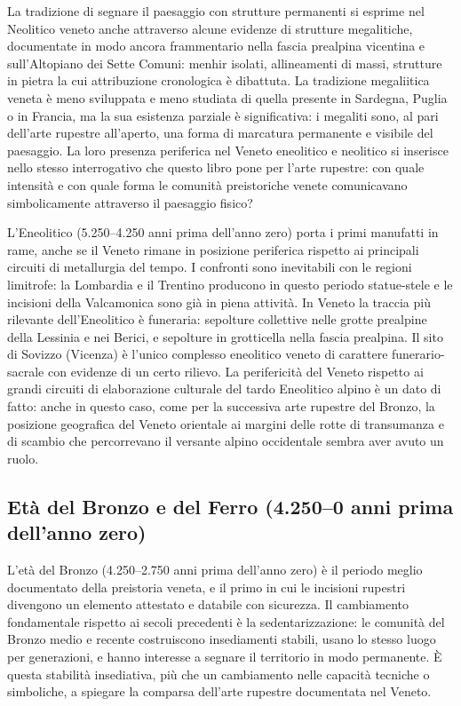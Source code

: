 La tradizione di segnare il paesaggio con strutture permanenti si esprime nel Neolitico veneto anche attraverso alcune evidenze di strutture megalitiche, documentate in modo ancora frammentario nella fascia prealpina vicentina e sull'Altopiano dei Sette Comuni: menhir isolati, allineamenti di massi, strutture in pietra la cui attribuzione cronologica è dibattuta. La tradizione megaliitica veneta è meno sviluppata e meno studiata di quella presente in Sardegna, Puglia o in Francia, ma la sua esistenza parziale è significativa: i megaliti sono, al pari dell'arte rupestre all'aperto, una forma di marcatura permanente e visibile del paesaggio. La loro presenza periferica nel Veneto eneolitico e neolitico si inserisce nello stesso interrogativo che questo libro pone per l'arte rupestre: con quale intensità e con quale forma le comunità preistoriche venete comunicavano simbolicamente attraverso il paesaggio fisico?

L'Eneolitico (5.250--4.250 anni prima dell'anno zero) porta i primi manufatti in rame, anche se il Veneto rimane in posizione periferica rispetto ai principali circuiti di metallurgia del tempo. I confronti sono inevitabili con le regioni limitrofe: la Lombardia e il Trentino producono in questo periodo statue-stele e le incisioni della Valcamonica sono già in piena attività. In Veneto la traccia più rilevante dell'Eneolitico è funeraria: sepolture collettive nelle grotte prealpine della Lessinia e nei Berici, e sepolture in grotticella nella fascia prealpina. Il sito di Sovizzo (Vicenza) è l'unico complesso eneolitico veneto di carattere funerario-sacrale con evidenze di un certo rilievo. La perifericità del Veneto rispetto ai grandi circuiti di elaborazione culturale del tardo Eneolitico alpino è un dato di fatto: anche in questo caso, come per la successiva arte rupestre del Bronzo, la posizione geografica del Veneto orientale ai margini delle rotte di transumanza e di scambio che percorrevano il versante alpino occidentale sembra aver avuto un ruolo.

\subsection{Età del Bronzo e del Ferro (4.250--0 anni prima dell'anno zero)}

L'età del Bronzo (4.250--2.750 anni prima dell'anno zero) è il periodo meglio documentato della preistoria veneta, e il primo in cui le incisioni rupestri divengono un elemento attestato e databile con sicurezza. Il cambiamento fondamentale rispetto ai secoli precedenti è la sedentarizzazione: le comunità del Bronzo medio e recente costruiscono insediamenti stabili, usano lo stesso luogo per generazioni, e hanno interesse a segnare il territorio in modo permanente. È questa stabilità insediativa, più che un cambiamento nelle capacità tecniche o simboliche, a spiegare la comparsa dell'arte rupestre documentata nel Veneto.

